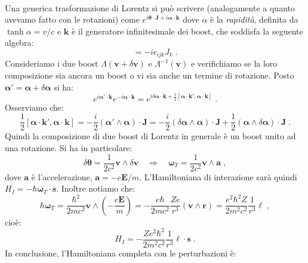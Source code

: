 \documentclass[12pt,a4paper]{report}
\theoremstyle{definition}
\numberwithin{equation}{section}
\begin{document}
\\
Una generica trasformazione di Lorentz si può scrivere (analogamente a quanto avevamo fatto con le rotazioni) come $e^{i\boldsymbol{\theta}\cdot\mathbf{J}+i\boldsymbol{\alpha}\cdot\mathbf{k}}$ dove $\alpha$ è la \textit{rapidità}, definita da $\tanh\alpha= v/c$ e $\mathbf{k}$ è il generatore infinitesimale dei boost, che soddisfa la seguente algebra:
\begin{equation}
[k_i,k_j]=-i\epsilon_{ijk}J_k\;.
\end{equation}
Consideriamo i due boost $\Lambda(\mathbf{v}+\delta\mathbf{v})$ e $\Lambda^{-1}(\mathbf{v})$ e verifichiamo se la loro composizione sia ancora un boost o vi sia anche un termine di rotazione. Posto $\boldsymbol{\alpha}'=\boldsymbol{\alpha}+\delta\boldsymbol{\alpha}$ si ha:
\begin{equation}
e^{i\boldsymbol{\alpha}'\cdot\mathbf{k}}e^{-i\boldsymbol{\alpha}\cdot\mathbf{k}}=e^{i\delta\boldsymbol{\alpha}\cdot\mathbf{k}+\frac{1}{2}[\boldsymbol{\alpha}\cdot\mathbf{k}',\boldsymbol{\alpha}\cdot\mathbf{k}]}\;.
\end{equation}
Osserviamo che:
\begin{equation}
\frac{1}{2}[\boldsymbol{\alpha}\cdot\mathbf{k}',\boldsymbol{\alpha}\cdot\mathbf{k}]=-\frac{i}{2}(\boldsymbol{\alpha}'\wedge\boldsymbol{\alpha})\cdot\mathbf{J}=-\frac{i}{2}(\delta\boldsymbol{\alpha}\wedge\boldsymbol{\alpha})\cdot\mathbf{J}+\frac{1}{2}(\boldsymbol{\alpha}\wedge\delta\boldsymbol{\alpha})\cdot\mathbf{J}\;.
\end{equation}
Quindi la composizione di due boost di Lorentz in generale è un boost unito ad una rotazione. Si ha in particolare:
\begin{equation}
\delta\boldsymbol{\theta}=\frac{1}{2c^2}\mathbf{v}\wedge\delta\mathbf{v}\quad \Longrightarrow \quad \boldsymbol{\omega}_T=\frac{1}{2c^2}\mathbf{v}\wedge\mathbf{a}\;,
\end{equation}
dove $\mathbf{a}$ è l'accelerazione, $\mathbf{a}=-e\mathbf{E}/m$. L'Hamiltoniana di interazione sarà quindi $H_I=-\hbar\boldsymbol{\omega}_T\cdot\mathbf{s}$. Inoltre notiamo che:
$$
\hbar\boldsymbol{\omega}_T=\frac{\hbar^2}{2mc^2}\mathbf{v}\wedge\left(-\frac{e\mathbf{E}}{m}\right)=-\frac{e\hbar}{2mc^2}\frac{Ze}{r^3}(\mathbf{v}\wedge\mathbf{r})=\frac{e^2\hbar^2Z}{2m^2c^2}\frac{1}{r^3}\boldsymbol{\ell}\;,
$$
cioè:
\begin{equation}
H_I=-\frac{Ze^2\hbar^2}{2m^2c^2}\frac{1}{r^3}\boldsymbol{\ell}\cdot\mathbf{s}\;.
\end{equation}
In conclusione, l'Hamiltoniana completa con le perturbazioni è:
\end{document}
